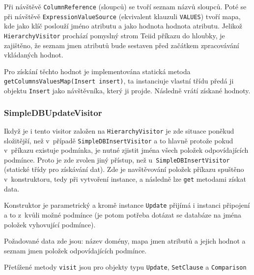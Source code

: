 \documentclass[oneside,12pt,final]{fithesis2}
\begin{document}
Při návštěvě \texttt{ColumnReference} (sloupců) se tvoří seznam názvů sloupců. Poté se při návštěvě \texttt{ExpressionValueSource} (ekvivalent klauzuli \texttt{VALUES}) tvoří mapa, kde jako klíč poslouží jméno atributu a jako hodnota hodnota atributu. Jelikož \texttt{HierarchyVisitor} prochází pomyslný strom Teiid příkazu do hloubky, je zajištěno, že seznam jmen atributů bude sestaven před začátkem zpracovávání vkládaných hodnot.

Pro získání těchto hodnot je implementována statická metoda \texttt{get\allowbreak Columns\allowbreak ValuesMap(Insert insert)}, ta instanciuje vlastní třídu předá ji objektu \texttt{Insert} jako návštěvníka, který ji projde. Následně vrátí získané hodnoty.

\subsubsection*{SimpleDBUpdateVisitor}
Ikdyž je i tento visitor založen na \texttt{HierarchyVisitor} je zde situace poněkud složitější, než v~případě \texttt{SimpleDBInsertVisitor} a to hlavně protože pokud v~příkazu existuje podmínka, je nutné zjistit jména všech položek odpovídajících podmínce. Proto je zde zvolen jiný přístup, než u~\texttt{SimpleDBInsertVisitor} (statické třídy pro získávání dat). Zde je navštěvování položek příkazu spuštěno v~konstruktoru, tedy při vytvoření instance, a následně lze \texttt{get} metodami získat  data.

Konstruktor je parametrický a kromě instance \texttt{Update} přijímá i instanci připojení a to z~kvůli možné podmínce (je potom potřeba dotázat se databáze na jména položek vyhovující podmínce).

Požadované data zde jsou: název domény, mapa jmen atributů a jejich hodnot a seznam jmen položek odpovídajících podmínce.

Přetížené metody \texttt{visit} jsou pro objekty typu \texttt{Update}, \texttt{SetClause} a \texttt{Comparison}
\end{document}
